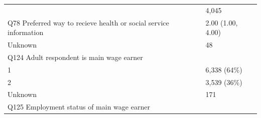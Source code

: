\documentclass[]{article}
\begin{document}
\begin{longtable}[]{@{}ll@{}}
\begin{minipage}[t]{0.71\columnwidth}
\end{minipage} & \begin{minipage}[t]{0.23\columnwidth}\raggedright
4,045\strut
\end{minipage}\tabularnewline
\begin{minipage}[t]{0.71\columnwidth}\raggedright
Q78 Preferred way to recieve health or social service information\strut
\end{minipage} & \begin{minipage}[t]{0.23\columnwidth}\raggedright
2.00 (1.00, 4.00)\strut
\end{minipage}\tabularnewline
\begin{minipage}[t]{0.71\columnwidth}\raggedright
Unknown\strut
\end{minipage} & \begin{minipage}[t]{0.23\columnwidth}\raggedright
48\strut
\end{minipage}\tabularnewline
\begin{minipage}[t]{0.71\columnwidth}\raggedright
Q124 Adult respondent is main wage earner\strut
\end{minipage} & \begin{minipage}[t]{0.23\columnwidth}\raggedright
\strut
\end{minipage}\tabularnewline
\begin{minipage}[t]{0.71\columnwidth}\raggedright
1\strut
\end{minipage} & \begin{minipage}[t]{0.23\columnwidth}\raggedright
6,338 (64\%)\strut
\end{minipage}\tabularnewline
\begin{minipage}[t]{0.71\columnwidth}\raggedright
2\strut
\end{minipage} & \begin{minipage}[t]{0.23\columnwidth}\raggedright
3,539 (36\%)\strut
\end{minipage}\tabularnewline
\begin{minipage}[t]{0.71\columnwidth}\raggedright
Unknown\strut
\end{minipage} & \begin{minipage}[t]{0.23\columnwidth}\raggedright
171\strut
\end{minipage}\tabularnewline
\begin{minipage}[t]{0.71\columnwidth}\raggedright
Q125 Employment status of main wage earner\strut
\end{minipage} & \begin{minipage}[t]{0.23\columnwidth}\raggedright

\end{minipage}
\end{longtable}
\end{document}
